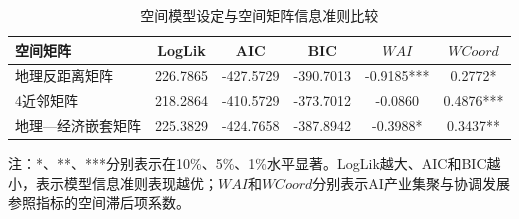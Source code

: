 \begin{table}[htbp]
\centering
\begin{threeparttable}
\caption{空间模型设定与空间矩阵信息准则比较}
\label{tab:model-comparison}
{\compacttableformat
\begin{tabular}{lccccc}
\toprule
空间矩阵 & LogLik & AIC & BIC & $WAI$ & $WCoord$ \\
\midrule
地理反距离矩阵 & 226.7865 & -427.5729 & -390.7013 & -0.9185*** & 0.2772* \\
4近邻矩阵 & 218.2864 & -410.5729 & -373.7012 & -0.0860 & 0.4876*** \\
地理—经济嵌套矩阵 & 225.3829 & -424.7658 & -387.8942 & -0.3988* & 0.3437** \\
\bottomrule
\end{tabular}
}
\begin{tablenotes}
\footnotesize
\item 注：*、**、***分别表示在10\%、5\%、1\%水平显著。LogLik越大、AIC和BIC越小，表示模型信息准则表现越优；$WAI$和$WCoord$分别表示AI产业集聚与协调发展参照指标的空间滞后项系数。
\end{tablenotes}
\end{threeparttable}
\end{table}
